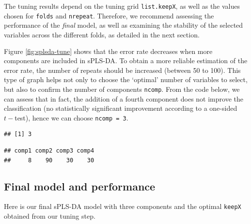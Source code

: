 \documentclass[]{book}
\newenvironment{Shaded}{\begin{snugshade}}{\end{snugshade}}
\newcommand{\CommentTok}[1]{\textcolor[rgb]{0.56,0.35,0.01}{\textit{#1}}}
\newcommand{\OperatorTok}[1]{\textcolor[rgb]{0.81,0.36,0.00}{\textbf{#1}}}
\newcommand{\NormalTok}[1]{#1}
\begin{document}
The tuning results depend on the tuning grid \texttt{list.keepX}, as
well as the values chosen for \texttt{folds} and \texttt{nrepeat}.
Therefore, we recommend assessing the performance of the \emph{final}
model, as well as examining the stability of the selected variables
across the different folds, as detailed in the next section.

Figure \ref{fig:splsda-tune} shows that the error rate decreases when
more components are included in sPLS-DA. To obtain a more reliable
estimation of the error rate, the number of repeats should be increased
(between 50 to 100). This type of graph helps not only to choose the
`optimal' number of variables to select, but also to confirm the number
of components \texttt{ncomp}. From the code below, we can assess that in
fact, the addition of a fourth component does not improve the
classification (no statistically significant improvement according to a
one-sided \(t-\)test), hence we can choose \texttt{ncomp\ =\ 3}.

\begin{Shaded}
\end{Shaded}

\begin{verbatim}
## [1] 3
\end{verbatim}

\begin{Shaded}
\end{Shaded}

\begin{verbatim}
## comp1 comp2 comp3 comp4 
##     8    90    30    30
\end{verbatim}

\subsection{Final model and performance}\label{final-splsda-perf}

Here is our final sPLS-DA model with three components and the optimal
\texttt{keepX} obtained from our tuning step.
\end{document}
